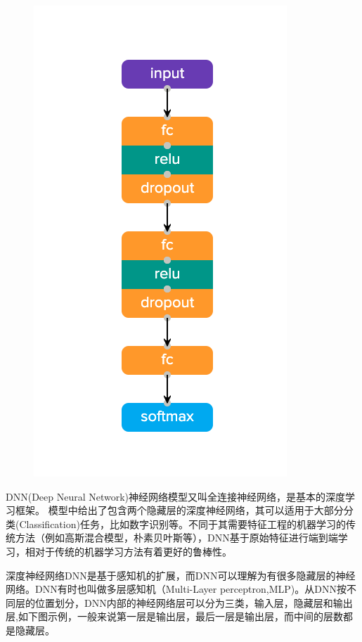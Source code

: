 \documentclass{progbookcn}
\begin{document}
\begin{figure}
\vspace{-1.3cm}

\includegraphics[scale = 0.5]{simple_dnn.png}

\end{figure}


DNN(Deep Neural Network)神经网络模型又叫全连接神经网络，是基本的深度学习框架。 模型中给出了包含两个隐藏层的深度神经网络，其可以适用于大部分分类(Classification)任务，比如数字识别等。不同于其需要特征工程的机器学习的传统方法（例如高斯混合模型，朴素贝叶斯等），DNN基于原始特征进行端到端学习，相对于传统的机器学习方法有着更好的鲁棒性。

 深度神经网络DNN是基于感知机的扩展，而DNN可以理解为有很多隐藏层的神经网络。DNN有时也叫做多层感知机（Multi-Layer perceptron,MLP)。从DNN按不同层的位置划分，DNN内部的神经网络层可以分为三类，输入层，隐藏层和输出层,如下图示例，一般来说第一层是输出层，最后一层是输出层，而中间的层数都是隐藏层。
\end{document}
